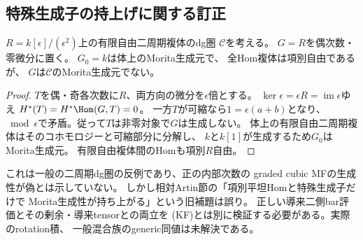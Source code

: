 \subsection{特殊生成子の持上げに関する訂正}
\begin{proposition}[項別平坦性だけでは生成性は持ち上がらない]
\label{aro:prop:generator-counterexample}
$R=k[\epsilon]/(\epsilon^2)$上の有限自由二周期複体のdg圏
$\mathcal C$を考える。
$G=R$を偶次数・零微分に置く。
$G_0=k$は体上のMorita生成元で、
全Hom複体は項別自由であるが、
$G$は$\mathcal C$のMorita生成元でない。
\end{proposition}
\begin{proof}
$T$を偶・奇各次数に$R$、両方向の微分を$\epsilon$倍とする。
$\ker\epsilon=\epsilon R=\operatorname{im}\epsilon$ゆえ
$H^*(T)=H^*\Hom(G,T)=0$。
一方$T$が可縮なら$1=\epsilon(a+b)$となり、
$\bmod\epsilon$で矛盾。従って$T$は非零対象で$G$は生成しない。
体上の有限自由二周期複体はそのコホモロジーと可縮部分に分解し、
$k$と$k[1]$が生成するため$G_0$はMorita生成元。
有限自由複体間のHomも項別$R$自由。
\end{proof}
\begin{remark}
これは一般の二周期dg圏の反例であり、正の内部次数の
graded cubic MFの生成性が偽とは示していない。
しかし相対Artin節の「項別平坦Homと特殊生成子だけで
Morita生成性が持ち上がる」という旧補題は誤り。
正しい導来二側bar評価とその剰余・導来tensorとの両立を
(KF)とは別に検証する必要がある。実際のrotation積、
一般混合族のgeneric同値は未解決である。
\end{remark}

